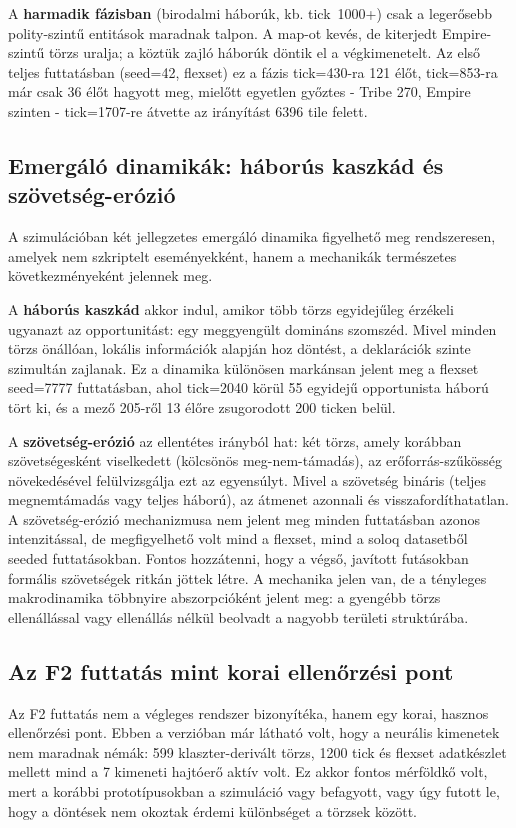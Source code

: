 ﻿\documentclass[a4paper,12pt]{report}
\begin{document}
A \textbf{harmadik fázisban} (birodalmi háborúk, kb. tick~1000+) csak a legerősebb
polity-szintű entitások maradnak talpon. A map-ot kevés, de kiterjedt Empire-szintű
törzs uralja; a köztük zajló háborúk döntik el a végkimenetelt. Az első teljes futtatásban
(seed=42, flexset) ez a fázis tick=430-ra 121 élőt, tick=853-ra már csak 36 élőt
hagyott meg, mielőtt egyetlen győztes - Tribe 270, Empire szinten - tick=1707-re
átvette az irányítást 6396 tile felett.

\subsection*{Emergáló dinamikák: háborús kaszkád és szövetség-erózió}

A szimulációban két jellegzetes emergáló dinamika figyelhető meg rendszeresen,
amelyek nem szkriptelt eseményekként, hanem a mechanikák természetes következményeként
jelennek meg.

A \textbf{háborús kaszkád} akkor indul, amikor több törzs egyidejűleg érzékeli ugyanazt
az opportunitást: egy meggyengült domináns szomszéd. Mivel minden törzs önállóan,
lokális információk alapján hoz döntést, a deklarációk szinte szimultán zajlanak.
Ez a dinamika különösen markánsan jelent meg a flexset seed=7777 futtatásban,
ahol tick=2040 körül 55 egyidejű opportunista háború tört ki, és a mező 205-ről
13 élőre zsugorodott 200 ticken belül.

A \textbf{szövetség-erózió} az ellentétes irányból hat: két törzs, amely korábban
szövetségesként viselkedett (kölcsönös meg-nem-támadás), az erőforrás-szűkösség
növekedésével felülvizsgálja ezt az egyensúlyt. Mivel a szövetség bináris
(teljes megnemtámadás vagy teljes háború), az átmenet azonnali és visszafordíthatatlan.
A szövetség-erózió mechanizmusa nem jelent meg minden futtatásban azonos intenzitással,
de megfigyelhető volt mind a flexset, mind a soloq datasetből seeded futtatásokban.
Fontos hozzátenni, hogy a végső, javított futásokban formális szövetségek ritkán
jöttek létre. A mechanika jelen van, de a tényleges makrodinamika többnyire
abszorpcióként jelent meg: a gyengébb törzs ellenállással vagy ellenállás nélkül
beolvadt a nagyobb területi struktúrába.

\subsection*{Az F2 futtatás mint korai ellenőrzési pont}

Az F2 futtatás nem a végleges rendszer bizonyítéka, hanem egy korai, hasznos
ellenőrzési pont. Ebben a verzióban már látható volt, hogy a neurális kimenetek nem
maradnak némák: 599 klaszter-derivált törzs, 1200 tick és flexset adatkészlet mellett
mind a 7 kimeneti hajtóerő aktív volt. Ez akkor fontos mérföldkő volt, mert a korábbi
prototípusokban a szimuláció vagy befagyott, vagy úgy futott le, hogy a döntések
nem okoztak érdemi különbséget a törzsek között.
\end{document}
